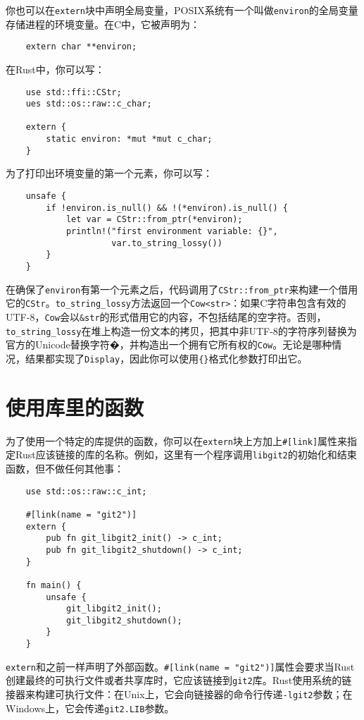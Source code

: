 你也可以在\texttt{extern}块中声明全局变量，POSIX系统有一个叫做\texttt{environ}的全局变量存储进程的环境变量。在C中，它被声明为：
\begin{verbatim}
    extern char **environ;
\end{verbatim}

在Rust中，你可以写：
\begin{verbatim}
    use std::ffi::CStr;
    ues std::os::raw::c_char;

    extern {
        static environ: *mut *mut c_char;
    }
\end{verbatim}

为了打印出环境变量的第一个元素，你可以写：
\begin{verbatim}
    unsafe {
        if !environ.is_null() && !(*environ).is_null() {
            let var = CStr::from_ptr(*environ);
            println!("first environment variable: {}",
                     var.to_string_lossy())
        }
    }
\end{verbatim}

在确保了\texttt{environ}有第一个元素之后，代码调用了\texttt{CStr::from\_ptr}来构建一个借用它的\texttt{CStr}。\texttt{to\_string\_lossy}方法返回一个\texttt{Cow<str>}：如果C字符串包含有效的UTF-8，\texttt{Cow}会以\texttt{\&str}的形式借用它的内容，不包括结尾的空字符。否则，\texttt{to\_string\_lossy}在堆上构造一份文本的拷贝，把其中非UTF-8的字符序列替换为官方的Unicode替换字符�，并构造出一个拥有它所有权的\texttt{Cow}。无论是哪种情况，结果都实现了\texttt{Display}，因此你可以使用\texttt{\{\}}格式化参数打印出它。

\section{使用库里的函数}
为了使用一个特定的库提供的函数，你可以在\texttt{extern}块上方加上\texttt{\#[link]}属性来指定Rust应该链接的库的名称。例如，这里有一个程序调用\texttt{libgit2}的初始化和结束函数，但不做任何其他事：
\begin{verbatim}
    use std::os::raw::c_int;

    #[link(name = "git2")]
    extern {
        pub fn git_libgit2_init() -> c_int;
        pub fn git_libgit2_shutdown() -> c_int;
    }

    fn main() {
        unsafe {
            git_libgit2_init();
            git_libgit2_shutdown();
        }
    }
\end{verbatim}

\texttt{extern}和之前一样声明了外部函数。\texttt{\#[link(name = "git2")]}属性会要求当Rust创建最终的可执行文件或者共享库时，它应该链接到\texttt{git2}库。Rust使用系统的链接器来构建可执行文件：在Unix上，它会向链接器的命令行传递\texttt{-lgit2}参数；在Windows上，它会传递\texttt{git2.LIB}参数。

